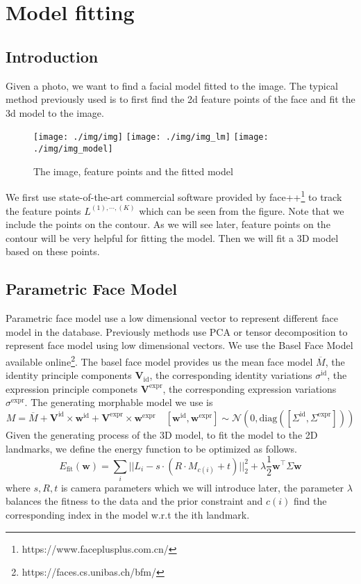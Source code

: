 
\section{Model fitting}
\subsection{Introduction}
Given a photo, we want to find a facial model fitted to the image. The typical method previously used is to first find the 2d feature points of the face and fit the 3d model to the image.

\begin{figure}[H]
\texttt{[image: ./img/img]}
\endminipage\hfill
{}
\texttt{[image: ./img/img\_lm]}
\endminipage\hfill
{}
\texttt{[image: ./img/img\_model]}
\endminipage
\caption{The image, feature points and the fitted model}
\end{figure}
We first use state-of-the-art commercial software provided by face++\footnote{https://www.faceplusplus.com.cn/} to track the feature points $L^{(1), \cdots, (K)}$ which can be seen from the figure. Note that we include the points on the contour. As we will see later, feature points on the contour will be very helpful for fitting the model. Then we will fit a 3D model based on these points.

\subsection{Parametric Face Model}
Parametric face model use a low dimensional vector to represent different face model in the database. Previously methods use PCA or tensor decomposition to represent face model using low dimensional vectors. We use the Basel Face Model available online\footnote{https://faces.cs.unibas.ch/bfm/}. The basel face model provides us the mean face model $\overline{M}$, the identity principle components $\mathbf{V}_{\text{id}}$, the corresponding identity variations $\sigma^{\text{id}}$, the expression principle componets $\mathbf{V}^{\text{expr}}$, the corresponding expression variations $\sigma^{\text{expr}}$. The generating morphable model we use is 
$$M = \overline{M} + \mathbf{V}^{\text{id}} \times \mathbf{w}^{\text{id}} + \mathbf{V}^{\text{expr}} \times \mathbf{w}^{\text{expr}} \quad [\mathbf{w}^{\text{id}},\mathbf{w}^{\text{expr}}] \sim \mathcal{N}(0,\text{diag}([\Sigma^{\text{id}}, \Sigma^{\text{expr}}]))$$
Given the generating process of the 3D model, to fit the model to the 2D landmarks, we define the energy function to be optimized as follows.
$$E_{\text{fit}}(\textbf{w}) = \sum_i ||L_i - s\cdot(R \cdot M_{c(i)} + t)||_2^2 + \lambda \frac{1}{2}\mathbf{w}^\top \Sigma \mathbf{w}$$
where $s, R, t$ is camera parameters which we will introduce later, the parameter $\lambda$ balances the fitness to the data and the prior constraint and $c(i)$ find the corresponding index in the model w.r.t the ith landmark. 

